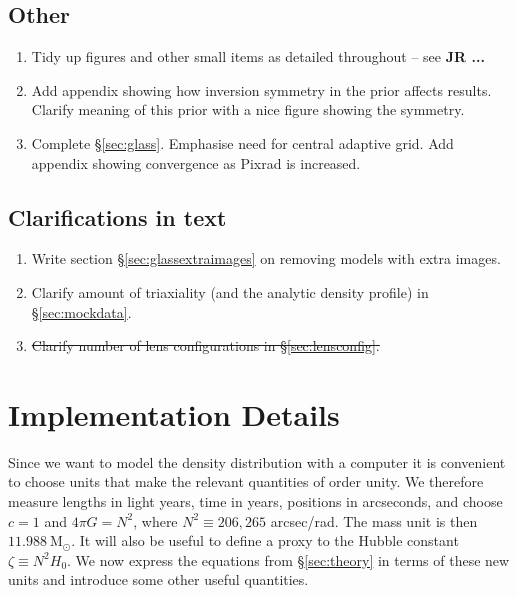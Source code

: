 \documentclass[galley,usenatbib]{mn2e}
\newcommand{\Msun}{\ensuremath{\mathrm{M}_\odot}}
\newcommand{\secref}[1] {\S\ref{#1}}
\begin{document}
\subsection{Other}

\begin{enumerate}

\item Tidy up figures and other small items as detailed throughout --
  see {\bf JR ... }

\item Add appendix showing how inversion symmetry in the prior affects
  results. Clarify meaning of this prior with a nice figure showing
  the symmetry.

\item Complete \S\ref{sec:glass}. Emphasise need for central adaptive
  grid. Add appendix showing convergence as Pixrad is increased.

\end{enumerate}

\subsection{Clarifications in text}

\begin{enumerate} 

\item Write section \S\ref{sec:glassextraimages} on removing models
  with extra images.

\item Clarify amount of triaxiality (and the analytic density profile)
  in \S\ref{sec:mockdata}.

\item \sout{Clarify number of lens configurations in \S\ref{sec:lensconfig}.}

\end{enumerate}


\appendix

\section{Implementation Details}

Since we want to model the density distribution with a computer it
is convenient to choose units that make the relevant quantities of order
unity.  We therefore measure lengths in light years, time in years, positions
in arcseconds, and choose $c=1$ and $4\pi G = N^2$, where $N^2 \equiv 206,265$
arcsec/rad. The mass unit is then $11.988\ \Msun$. It will also be useful to
define a proxy to the Hubble constant $\zeta \equiv N^2 H_0$. We now 
express the equations from \secref{sec:theory} in terms of these new units
and introduce some other useful quantities.
\end{document}
